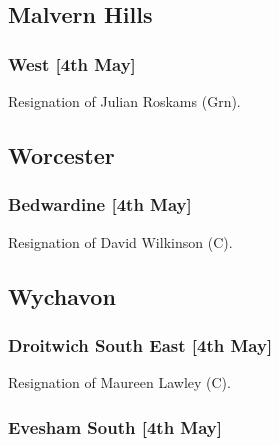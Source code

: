 \documentclass[a4paper,openany]{book}
\begin{document}
\begin{resultsiii}
\subsection*{Malvern Hills}

\subsubsection*{West \hspace*{\fill}\nolinebreak[1]%
\enspace\hspace*{\fill}
[4th May]}


Resignation of Julian Roskams (Grn).

\subsection*{Worcester}

\subsubsection*{Bedwardine \hspace*{\fill}\nolinebreak[1]%
\enspace\hspace*{\fill}
[4th May]}


Resignation of David Wilkinson (C).

\subsection*{Wychavon}

\subsubsection*{Droitwich South East \hspace*{\fill}\nolinebreak[1]%
\enspace\hspace*{\fill}
[4th May]}


Resignation of Maureen Lawley (C).

\subsubsection*{Evesham South \hspace*{\fill}\nolinebreak[1]%
\enspace\hspace*{\fill}
[4th May]}


\end{resultsiii}
\end{document}
